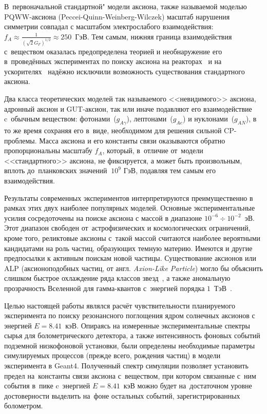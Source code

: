 \documentclass[a4paper,article,14pt]{extarticle}
\begin{document}
В~первоначальной стандартной" модели аксиона, также называемой моделью PQWW-аксиона (Peccei-Quinn-Weinberg-Wilczek) масштаб нарушения симметрии совпадал с масштабом электрослабого взаимодействия:
$f_A \approx \frac{1}{(\sqrt{2} G_F)^{1/2}} \approx 250$~ГэВ.
Тем самым, нижняя граница взаимодействия с~веществом оказалась предопределена теорией и необнаружение его в~проведённых экспериментах по поиску аксиона на реакторах~\cite{ReactorExperiment1,ReactorExperiment2} и на ускорителях~\cite{AcceleratorExperiment1,AcceleratorExperiment2} надёжно исключили возможность существования стандартного аксиона.

Два класса теоретических моделей так называемого <<невидимого>> аксиона, адронный аксион и GUT-аксион, так или иначе подавляют его взаимодействие c~обычным веществом: фотонами~($g_{A\gamma}$), лептонами~($g_{Ae}$) и нуклонами~($g_{AN}$), в то же время сохраняя его в~виде, необходимом для решения сильной CP-проблемы.
Масса аксиона и его константы связи оказываются обратно пропорциональны масштабу $f_A$, который, в~отличие от~модели <<стандартного>> аксиона, не фиксируется, а может быть произвольным, вплоть до~планковских значений $~10^9 \text{ ГэВ}$, подавляя тем самым его взаимодействия.

Результаты современных экспериментов интерпретируются преимущественно в рамках этих двух наиболее популярных моделей.
Основные экспериментальные усилия сосредоточены на поиске аксиона с массой в диапазоне $10^{-6} \div 10^{-2}$~эВ.
Этот диапазон свободен от~астрофизических и космологических ограничений, кроме того, реликтовые аксионы с~такой массой считаются наиболее вероятными кандидатами на роль частиц, образующих темную материю.
Имеются и другие предпосылки к активным поискам новой частицы.
Существование аксионов или ALP (аксионоподобных частиц, от англ. \textit{Axion-Like Particle}) могло бы объяснить слишком быстрое охлаждение ряда классов звезд~\cite{whitedwarfs}, а также аномальную прозрачность Вселенной для гамма-квантов с~энергией порядка $1$~ТэВ~\cite{transparency,transparency_axion}.

Целью настоящей работы являлся расчёт чувствительности планируемого эксперимента по поиску резонансного поглощения ядром {\Tm} солнечных аксионов с энергией $E = 8.41$~кэВ.
Опираясь на измеренные экспериментальные спектры сырья для болометрического детектора, а также интенсивность фоновых событий подземной низкофоновой установки, были определены необходимые параметры симулируемых процессов (прежде всего, рождения частиц) в модели эксперимента в Geant4.
Полученный спектр симуляции позволяет установить предел на~константы связи аксиона с~веществом, при котором связанные с~ним события в~пике c~энергией $E = 8.41$~кэВ можно будет на~достаточном уровне достоверности выделить на~фоне остальных событий, зарегистрированных болометром.
\end{document}
